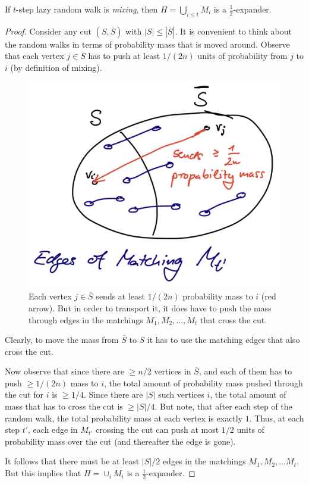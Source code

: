 \begin{lemma}
If $t$-step lazy random walk is \emph{mixing}, then $H = \bigcup_{i \leq t} M_i$ is a $\frac{1}{2}$-expander.
\end{lemma}
\begin{proof}
Consider any cut $(S, \overline{S})$ with $|S| \leq |\overline{S}|$. It is convenient to think about the random walks in terms of probability mass that is moved around. Observe that each vertex $j \in \overline{S}$ has to push at least $1/(2n)$ units of probability from $j$ to $i$ (by definition of mixing). 

\begin{figure}[!ht]
    \centering
    \includegraphics[scale=0.15]{./fig/MixingWalkIsExpander_lectureCutMatching.jpeg}
    \caption{Each vertex $j \in \overline{S}$ sends at least $1/(2n)$ probability mass to $i$ (red arrow). But in order to transport it, it does have to push the mass through edges in the matchings $M_1, M_2, \dots, M_t$ that cross the cut.}
    \label{fig:my_label}
\end{figure}

Clearly, to move the mass from $\overline{S}$ to $S$ it has to use the matching edges that also cross the cut.

Now observe that since there are $\geq n/2$ vertices in $\overline{S}$, and each of them has to push $\geq 1/(2n)$ mass to $i$, the total amount of probability mass pushed through the cut for $i$ is $\geq 1/4$. Since there are $|S|$ such vertices $i$, the total amount of mass that has to cross the cut is $\geq |S|/4$. 
But note, that after each step of the random walk, the total probability mass at each vertex is exactly $1$. Thus, at each step $t'$, each edge in $M_{t'}$ crossing the cut can push at most $1/2$ units of probability mass over the cut (and thereafter the edge is gone). 

It follows that there must be at least $|S|/2$ edges in the matchings $M_1, M_2, \dots M_{t}$. But this implies that $H = \cup_i M_i$ is a $\frac{1}{2}$-expander.

\end{proof}

